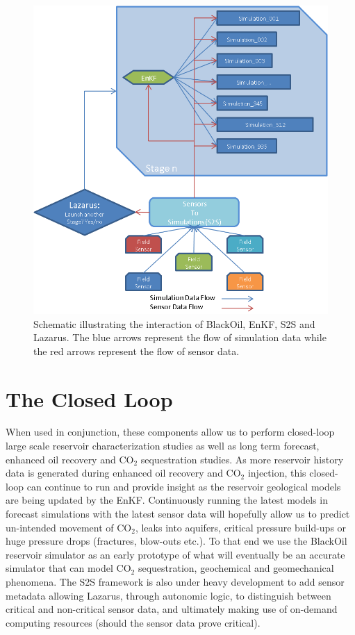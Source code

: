 \documentclass[10pt,conference,final]{IEEEtran}
\begin{document}
\begin{figure}
\begin{center}
\includegraphics*[scale=0.7,angle=0]{figures/Picture2.png}
\end{center}
\caption{Schematic illustrating the interaction of BlackOil, EnKF, S2S and Lazarus. The 
blue arrows represent the flow of 
simulation data while the red arrows represent the flow of sensor data.}
\label{fig:Data Flow}
\end{figure}

\section*{The Closed Loop}

When used in conjunction, these components allow us to perform closed-loop large scale 
reservoir characterization studies as well as long term forecast, enhanced oil recovery 
and CO$_2$ sequestration studies. As more reservoir history data is generated during 
enhanced oil recovery and CO$_2$ injection, this closed-loop can continue to run and 
provide insight as the reservoir geological models are being updated by the EnKF. 
Continuously running the latest models in forecast simulations with the 
latest sensor data will hopefully allow us to predict un-intended movement of CO$_2$, 
leaks into aquifers, critical pressure build-ups or huge pressure drops (fractures, 
blow-outs etc.). To that end we use the BlackOil reservoir simulator as an early prototype 
of what will eventually be an accurate simulator that can model CO$_2$ sequestration, 
geochemical and geomechanical phenomena. The S2S framework is also under heavy development 
to add sensor metadata allowing Lazarus, through autonomic logic, to distinguish between 
critical and non-critical sensor data, and ultimately making use of on-demand computing 
resources (should the sensor data prove critical).
\end{document}
